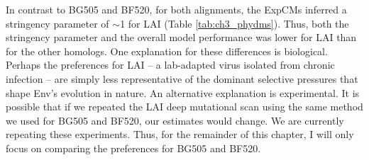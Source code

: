 \documentclass[9pt]{elife}
\begin{document}
In contrast to BG505 and BF520, for both alignments, the ExpCMs inferred a stringency parameter of $\sim$1 for LAI (Table \ref{tab:ch3_phydms}).
Thus, both the stringency parameter and the overall model performance was lower for LAI than for the other homologs.
One explanation for these differences is biological.
Perhaps the preferences for LAI -- a lab-adapted virus isolated from chronic infection -- are simply less representative of the dominant selective pressures that shape Env's evolution in nature.
An alternative explanation is experimental.
It is possible that if we repeated the LAI deep mutational scan using the same method we used for BG505 and BF520, our estimates would change.
We are currently repeating these experiments.
Thus, for the remainder of this chapter, I will only focus on comparing the preferences for BG505 and BF520.
\end{document}
